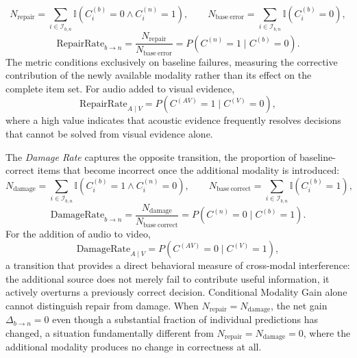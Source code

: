 \begin{description}
\begin{equation}
N_{\mathrm{repair}}
=
\sum_{i \in \mathcal{I}_{b,n}}
\mathbb{I}
\left(
C_i^{(b)}=0
\land
C_i^{(n)}=1
\right),
\qquad
N_{\mathrm{base\ error}}
=
\sum_{i \in \mathcal{I}_{b,n}}
\mathbb{I}
\left(
C_i^{(b)}=0
\right),
\end{equation}
\begin{equation}
\mathrm{RepairRate}_{b \rightarrow n}
=
\frac{
N_{\mathrm{repair}}
}{
N_{\mathrm{base\ error}}
}
=
P
\left(
C^{(n)}=1
\mid
C^{(b)}=0
\right).
\end{equation}
The metric conditions exclusively on baseline failures, measuring the corrective contribution of the newly available modality rather than its effect on the complete item set. For audio added to visual evidence,
\begin{equation}
\mathrm{RepairRate}_{A\mid V}
=
P
\left(
C^{(AV)}=1
\mid
C^{(V)}=0
\right),
\end{equation}
where a high value indicates that acoustic evidence frequently resolves decisions that cannot be solved from visual evidence alone.
\item[Damage Rate] The \textit{Damage Rate} captures the opposite transition, the proportion of baseline-correct items that become incorrect once the additional modality is introduced:
\begin{equation}
N_{\mathrm{damage}}
=
\sum_{i \in \mathcal{I}_{b,n}}
\mathbb{I}
\left(
C_i^{(b)}=1
\land
C_i^{(n)}=0
\right),
\qquad
N_{\mathrm{base\ correct}}
=
\sum_{i \in \mathcal{I}_{b,n}}
\mathbb{I}
\left(
C_i^{(b)}=1
\right),
\end{equation}
\begin{equation}
\mathrm{DamageRate}_{b \rightarrow n}
=
\frac{
N_{\mathrm{damage}}
}{
N_{\mathrm{base\ correct}}
}
=
P
\left(
C^{(n)}=0
\mid
C^{(b)}=1
\right).
\end{equation}
For the addition of audio to video,
\begin{equation}
\mathrm{DamageRate}_{A\mid V}
=
P
\left(
C^{(AV)}=0
\mid
C^{(V)}=1
\right),
\end{equation}
a transition that provides a direct behavioral measure of cross-modal interference: the additional source does not merely fail to contribute useful information, it actively overturns a previously correct decision.
Conditional Modality Gain alone cannot distinguish repair from damage. When \(N_{\mathrm{repair}} = N_{\mathrm{damage}}\), the net gain \(\Delta_{b \rightarrow n} = 0\) even though a substantial fraction of individual predictions has changed, a situation fundamentally different from \(N_{\mathrm{repair}} = N_{\mathrm{damage}} = 0\), where the additional modality produces no change in correctness at all.

\end{description}
